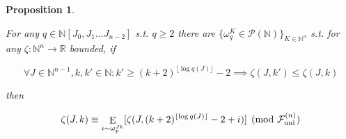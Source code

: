 \documentclass{article}
\numberwithin{equation}{section}
\theoremstyle{definition}
\theoremstyle{plain}
\newtheorem{proposition}{Proposition}[section]
\DeclareMathOperator{\E}{E}
\newcommand{\Nats}{\mathbb{N}}
\newcommand{\Reals}{\mathbb{R}}
\newcommand{\NatPolyJ}{\Nats[J_0, J_1 \ldots J_{n-2}]}
\newcommand{\NatFun}{\Nats^n \rightarrow}
\newcommand{\Floor}[1]{\lfloor #1 \rfloor}
\newcommand{\Fall}{\mathcal{F}}
\newcommand{\FallU}{{\Fall_{\textnormal{uni}}^{(n)}}}
\begin{document}
\begin{samepage}
\begin{proposition}
\label{prp:fall_uni_weak}

For any ${q \in \NatPolyJ}$ s.t. ${q \geq 2}$ there are ${\{\omega_q^K \in \mathcal{P}(\Nats)\}_{K \in \Nats^n}}$ s.t. for any ${\zeta: \NatFun \Reals}$ bounded, if 

\begin{equation}
\label{eqn:prp__fall_uni_weak__prem}
\forall J \in \Nats^{n-1}, k,k' \in \Nats: k' \geq (k+2)^{\Floor{\log q(J)}}-2 \implies \zeta(J,k') \leq \zeta(J,k)
\end{equation}

then

\begin{equation}
\label{eqn:prp__fall_uni_weak__conc}
\zeta(J,k) \equiv \E_{i \sim \omega_p^{Jk}}[\zeta(J,(k+2)^{\Floor{\log q(J)}}-2+i)] \pmod \FallU
\end{equation}

\end{proposition}
\end{samepage}
\end{document}
